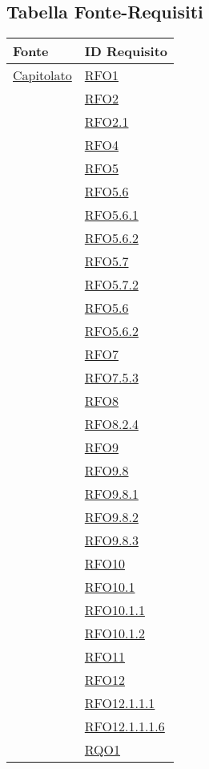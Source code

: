 \newpage
\subsection{Tabella Fonte-Requisiti}
\normalsize
\begin{longtable}{|>{\centering}m{5cm}|m{5cm}<{\centering}|}
\hline 
\textbf{Fonte} & \textbf{ID Requisito}\\
\hline
\endhead
\hyperlink{Capitolato}{Capitolato}
& \hyperlink{RFO1}{RFO1}\\
& \hyperlink{RFO2}{RFO2}\\
& \hyperlink{RFO2.1}{RFO2.1}\\
& \hyperlink{RFO4}{RFO4}\\
& \hyperlink{RFO5}{RFO5}\\
& \hyperlink{RFO5.6}{RFO5.6}\\
& \hyperlink{RFO5.6.1}{RFO5.6.1}\\
& \hyperlink{RFO5.6.2}{RFO5.6.2}\\
& \hyperlink{RFO5.7}{RFO5.7}\\
& \hyperlink{RFO5.7.2}{RFO5.7.2}\\
& \hyperlink{RFO5.6}{RFO5.6}\\
& \hyperlink{RFO5.6.2}{RFO5.6.2}\\
& \hyperlink{RFO7}{RFO7}\\
& \hyperlink{RFO7.5.3}{RFO7.5.3}\\
& \hyperlink{RFO8}{RFO8}\\
& \hyperlink{RFO8.2.4}{RFO8.2.4}\\
& \hyperlink{RFO9}{RFO9}\\
& \hyperlink{RFO9.8}{RFO9.8}\\
& \hyperlink{RFO9.8.1}{RFO9.8.1}\\
& \hyperlink{RFO9.8.2}{RFO9.8.2}\\
& \hyperlink{RFO9.8.3}{RFO9.8.3}\\
& \hyperlink{RFO10}{RFO10}\\
& \hyperlink{RFO10.1}{RFO10.1}\\
& \hyperlink{RFO10.1.1}{RFO10.1.1}\\
& \hyperlink{RFO10.1.2}{RFO10.1.2}\\
& \hyperlink{RFO11}{RFO11}\\
& \hyperlink{RFO12}{RFO12}\\
& \hyperlink{RFO12.1.1.1}{RFO12.1.1.1}\\
& \hyperlink{RFO12.1.1.1.6}{RFO12.1.1.1.6}\\
& \hyperlink{RQO1}{RQO1}\\

\end{longtable}
